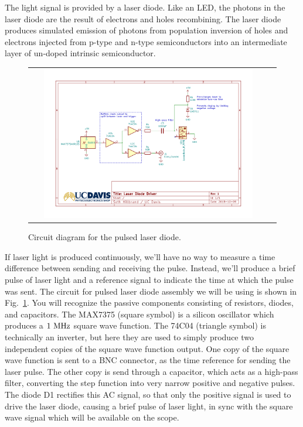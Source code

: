 The light signal is provided by a laser diode.  Like an
LED, the photons in the laser diode are the result of electrons and
holes recombining.  The laser diode produces simulated emission of
photons from population inversion of holes and electrons injected from
p-type and n-type semiconductors into an intermediate layer of
un-doped intrinsic semiconductor.  

\begin{figure}[htbp]
\begin{center}
\begin{tabular}{cc}
\includegraphics[width=0.9\textwidth]{figs/labs/c_air/cair_diodedriver}
\end{tabular}
\end{center}
\caption{\label{fig:clasercirc} Circuit diagram for the pulsed laser diode.}
\end{figure}

If laser light is produced continuously, we'll have no way to measure
a time difference between sending and receiving the pulse.  Instead,
we'll produce a brief pulse of laser light and a reference signal to
indicate the time at which the pulse was sent.  The circuit for pulsed
laser diode assembly we will be using is shown in
Fig.~\ref{fig:clasercirc}.  You will recognize the passive components
consisting of resistors, diodes, and capacitors.  The MAX7375 (square
symbol) is a silicon oscillator which produces a $1~\rm MHz$ square
wave function.  The 74C04 (triangle symbol) is technically an
inverter, but here they are used to simply produce two independent
copies of the square wave function output.  One copy of the square
wave function is sent to a BNC connector, as the time reference for
sending the laser pulse.  The other copy is send through a capacitor,
which acts as a high-pass filter, converting the step function into
very narrow positive and negative pulses.  The diode D1 rectifies this
AC signal, so that only the positive signal is used to drive the laser
diode, causing a brief pulse of laser light, in sync with the square
wave signal which will be available on the scope.

